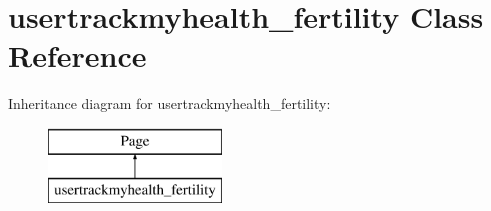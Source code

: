 \hypertarget{classusertrackmyhealth__fertility}{\section{usertrackmyhealth\-\_\-fertility Class Reference}
\label{classusertrackmyhealth__fertility}
}
Inheritance diagram for usertrackmyhealth\-\_\-fertility\-:\begin{figure}[H]
\begin{center}
\leavevmode
\includegraphics[height=2.000000cm]{classusertrackmyhealth__fertility}
\end{center}
\end{figure}
